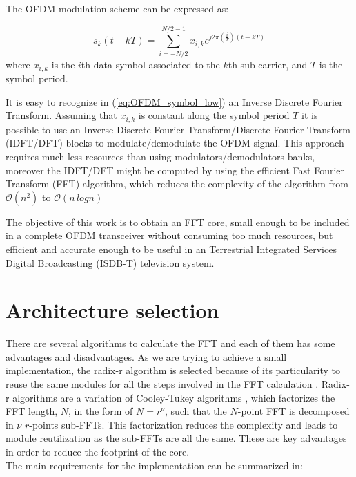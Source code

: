 \documentclass[conference]{IEEEtran}
\begin{document}
The OFDM modulation scheme can be expressed as:

\begin{equation}
s_{k}(t-kT) =
	\sum\limits_{i=-N/2}^{N/2-1} x_{i,k} e^{j2\pi
	\left(\frac{i}{T}\right)(t-kT)}
\label{eq:OFDM_symbol_low}
\end{equation}
where $x_{i,k}$ is the $i$th data symbol associated to the $k$th sub-carrier, and $T$ is the symbol period.

It is easy to recognize in (\ref{eq:OFDM_symbol_low}) an Inverse Discrete Fourier Transform. 
Assuming that $x_{i,k}$ is constant along the symbol period $T$ it is possible to use an Inverse Discrete Fourier Transform\slash Discrete Fourier Transform
(IDFT\slash DFT) blocks to modulate\slash demodulate the OFDM signal. This approach requires much less resources than using modulators\slash demodulators 
banks, moreover the IDFT\slash DFT might be computed by using the efficient Fast Fourier Transform (FFT) algorithm, 
which reduces the complexity of the algorithm from $\mathcal{O}(n^2)$ to $\mathcal{O}(n \, log n)$

The objective of this work is to obtain an FFT core, small enough to be included in a complete OFDM transceiver without consuming 
too much resources, but efficient and accurate enough to be useful in an Terrestrial Integrated Services Digital Broadcasting (ISDB-T) television system.

\section{Architecture selection}

There are several algorithms to calculate the FFT and each of them has some advantages and disadvantages. As we are trying to achieve a small
implementation, the radix-r algorithm is selected because of its particularity to reuse the same modules for all the steps involved in the FFT calculation \cite{Schaffer2_3}.
Radix-r algorithms are a variation of Cooley-Tukey algorithms \cite{MeyerRadix}, which factorizes the FFT length, $N$, in the form of $N = r^\nu$, such that the $N$-point FFT 
is decomposed in $\nu$ $r$-points sub-FFTs. This factorization reduces the complexity and leads to module reutilization as the sub-FFTs are all the same.
These are key advantages in order to reduce the footprint of the core.\\  
The main requirements for the implementation can be summarized in:
\end{document}

